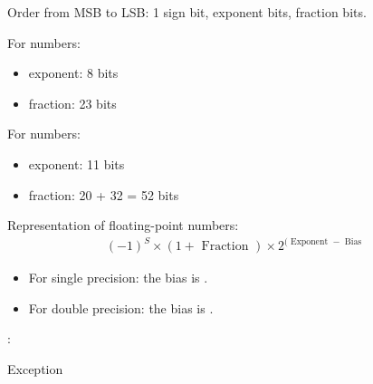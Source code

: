 \begin{multicols}{3}
    \par Order from MSB to LSB: 1 sign bit, exponent bits, fraction bits.
    \par For  numbers:
      \begin{itemize}
        \item exponent: 8 bits
        \item fraction: 23 bits
      \end{itemize}
    \par For  numbers:
      \begin{itemize}
        \item exponent: 11 bits
        \item fraction: 20 + 32 = 52 bits
      \end{itemize}
    \par Representation of floating-point numbers:
        \begin{align*}
          (-1)^{S} \times (1 + \mbox{ Fraction }) \times 2^{(\mbox{ Exponent }
          - \mbox{ Bias }}
        \end{align*}
      \begin{itemize}
        \item For single precision: the bias is .
        \item For double precision: the bias is .
      \end{itemize}

    \par {}:
    \begin{algorithm}[H]
      \begin{algorithmic}[1]
          \EndWhile
              \EndWhile
              \EndWhile
            \EndIf
              Exception
            \EndIf
            \State {}
          \EndWhile
        \EndFunction
      \end{algorithmic}
    \end{algorithm}


\end{multicols}
